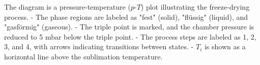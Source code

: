 The diagram is a pressure-temperature (\(p\)-\(T\)) plot illustrating the freeze-drying process.  
- The phase regions are labeled as "fest" (solid), "flüssig" (liquid), and "gasförmig" (gaseous).  
- The triple point is marked, and the chamber pressure is reduced to 5 mbar below the triple point.  
- The process steps are labeled as 1, 2, 3, and 4, with arrows indicating transitions between states.  
- \(T_i\) is shown as a horizontal line above the sublimation temperature.